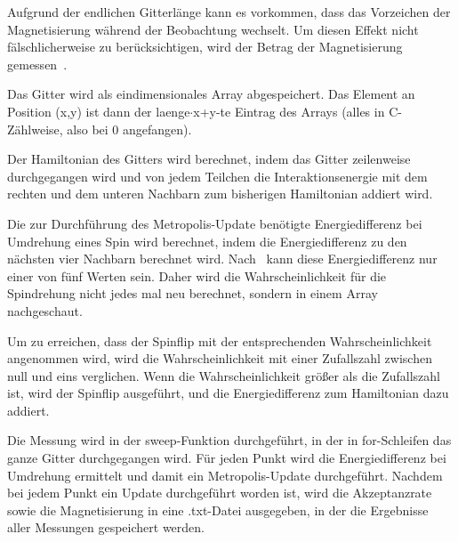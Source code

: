 	Aufgrund der endlichen Gitterlänge kann es vorkommen, dass das Vorzeichen der Magnetisierung während der Beobachtung wechselt. Um diesen Effekt nicht fälschlicherweise zu berücksichtigen, wird der Betrag der Magnetisierung gemessen~\cite[vgl. ][S. 106 ff.]{binderheermann}.
	
	
	Das Gitter wird als eindimensionales Array abgespeichert. Das Element an Position (x,y) ist dann der laenge$\cdot$x+y-te Eintrag des Arrays (alles in C-Zählweise, also bei 0 angefangen).

	Der Hamiltonian des Gitters wird berechnet, indem das Gitter zeilenweise durchgegangen wird und von jedem Teilchen die Interaktionsenergie mit dem rechten und dem unteren Nachbarn zum bisherigen Hamiltonian addiert wird.
	
	Die zur Durchführung des Metropolis-Update benötigte Energiedifferenz bei Umdrehung eines Spin wird berechnet, indem die Energiedifferenz zu den nächsten vier Nachbarn berechnet wird. 
	Nach~\cite[S. 103]{binderheermann} kann diese Energiedifferenz nur einer von fünf Werten sein. Daher wird die Wahrscheinlichkeit für die Spindrehung nicht jedes mal neu berechnet, sondern in einem Array nachgeschaut.
	
	Um zu erreichen, dass der Spinflip mit der entsprechenden Wahrscheinlichkeit angenommen wird, wird die Wahrscheinlichkeit mit einer Zufallszahl zwischen null und eins verglichen\cite[nach][]{metropolisupdate}. Wenn die Wahrscheinlichkeit größer als die Zufallszahl ist, wird der Spinflip ausgeführt, und die Energiedifferenz zum Hamiltonian dazu addiert. 
	
	Die Messung wird in der sweep-Funktion durchgeführt, in der in for-Schleifen das ganze Gitter durchgegangen wird. Für jeden Punkt wird die Energiedifferenz bei Umdrehung ermittelt und damit ein Metropolis-Update durchgeführt. Nachdem bei jedem Punkt ein Update durchgeführt worden ist, wird die Akzeptanzrate sowie die Magnetisierung in eine .txt-Datei ausgegeben, in der die Ergebnisse aller Messungen gespeichert werden.
	
